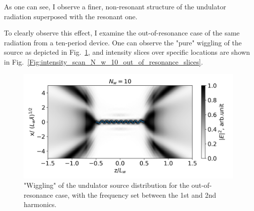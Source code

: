     As one can see, I observe a finer, non-resonant structure of the undulator radiation superposed with the resonant one. 

    To clearly observe this effect, I examine the out-of-resonance case of the same radiation from a ten-period device. One can observe the "pure" wiggling of the source as depicted in Fig.~\ref{Fig:intensity_scan_N_w_10_out_of_resonance}, and intensity slices over specific locations are shown in Fig.~\ref{Fig:intensity_scan_N_w_10_out_of_resonance_slices}.

    \begin{figure}[h!]
        \centering
        \includegraphics[width=0.9\linewidth]{content/images/Synchrotron_Radiation/intensity_scan_N_w_10_out_of_resonance.png}
        \captionsetup{justification=centering}
        \caption{"Wiggling" of the undulator source distribution for the out-of-resonance case, with the frequency set between the 1st and 2nd harmonics.}
        \label{Fig:intensity_scan_N_w_10_out_of_resonance}
    \end{figure}

